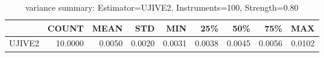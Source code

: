 \begin{table}[ht]
\centering
\caption{variance summary: Estimator=UJIVE2, Instruments=100, Strength=0.80}
\begin{tabular}{lrrrrrrrr}
\toprule
 & COUNT & MEAN & STD & MIN & 25\% & 50\% & 75\% & MAX \\
\midrule
UJIVE2 & 10.0000 & 0.0050 & 0.0020 & 0.0031 & 0.0038 & 0.0045 & 0.0056 & 0.0102 \\
\bottomrule
\end{tabular}
\end{table}
